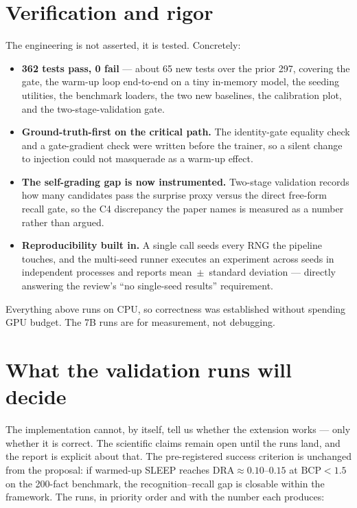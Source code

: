 \documentclass[11pt]{article}
\begin{document}
\section{Verification and rigor}

The engineering is not asserted, it is tested. Concretely:

\begin{itemize}
  \item \textbf{362 tests pass, 0 fail} --- about 65 new tests over the prior
    297, covering the gate, the warm-up loop end-to-end on a tiny in-memory
    model, the seeding utilities, the benchmark loaders, the two new baselines,
    the calibration plot, and the two-stage-validation gate.
  \item \textbf{Ground-truth-first on the critical path.} The identity-gate
    equality check and a gate-gradient check were written before the trainer,
    so a silent change to injection could not masquerade as a warm-up effect.
  \item \textbf{The self-grading gap is now instrumented.} Two-stage validation
    records how many candidates pass the surprise proxy versus the direct
    free-form recall gate, so the C4 discrepancy the paper names is measured as
    a number rather than argued.
  \item \textbf{Reproducibility built in.} A single call seeds every RNG the
    pipeline touches, and the multi-seed runner executes an experiment across
    seeds in independent processes and reports mean~$\pm$~standard deviation ---
    directly answering the review's ``no single-seed results'' requirement.
\end{itemize}

Everything above runs on CPU, so correctness was established without spending
GPU budget. The 7B runs are for measurement, not debugging.

\section{What the validation runs will decide}
\label{sec:runs}

The implementation cannot, by itself, tell us whether the extension works ---
only whether it is correct. The scientific claims remain open until the runs
land, and the report is explicit about that. The pre-registered success
criterion is unchanged from the proposal: if warmed-up SLEEP reaches
$\mathrm{DRA}\approx0.10$--$0.15$ at $\mathrm{BCP}<1.5$ on the 200-fact
benchmark, the recognition--recall gap is closable within the framework. The
runs, in priority order and with the number each produces:
\end{document}
